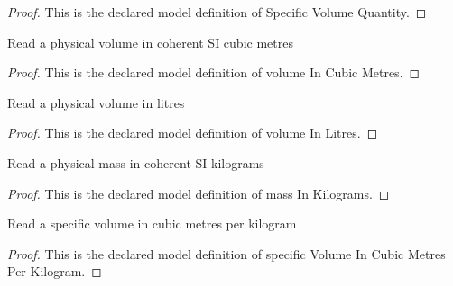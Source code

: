 \begin{proof}
  This is the declared model definition of Specific Volume Quantity.
\end{proof}
\begin{definition}
  \label{def:physics:phyx-mini-0444:phyxminiproblems-problemphyxmini0444-volumeincubicmetres}
  Read a physical volume in coherent SI cubic metres
\end{definition}
\begin{proof}
  This is the declared model definition of volume In Cubic Metres.
\end{proof}
\begin{definition}
  \label{def:physics:phyx-mini-0444:phyxminiproblems-problemphyxmini0444-volumeinlitres}
  Read a physical volume in litres
\end{definition}
\begin{proof}
  This is the declared model definition of volume In Litres.
\end{proof}
\begin{definition}
  \label{def:physics:phyx-mini-0444:phyxminiproblems-problemphyxmini0444-massinkilograms}
  Read a physical mass in coherent SI kilograms
\end{definition}
\begin{proof}
  This is the declared model definition of mass In Kilograms.
\end{proof}
\begin{definition}
  \label{def:physics:phyx-mini-0444:phyxminiproblems-problemphyxmini0444-specificvolumeincubicmetresperkilogram}
  Read a specific volume in cubic metres per kilogram
\end{definition}
\begin{proof}
  This is the declared model definition of specific Volume In Cubic Metres Per Kilogram.
\end{proof}
